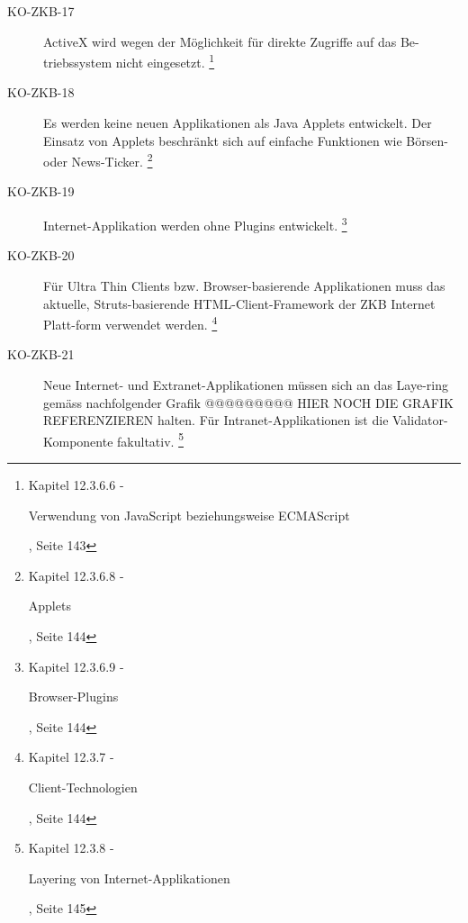 \documentclass[
11pt, %
a4paper, %
BCOR25mm, %
DIV14, %
footsepline = false, %
headsepline, %
twoside, %
openright,
abstracton, %
listof=totocnumbered, %
bibliography=totocnumbered %
]{scrreprt}
\begin{document}
\begin{description}
    \item[KO-ZKB-17] ActiveX wird wegen der Möglichkeit für direkte Zugriffe auf
    das Be-triebssystem nicht eingesetzt.
    \footnote{\cite{ZkbHandbuchDerItArchitektur} Kapitel 12.3.6.6 -
    \begin{itshape}Verwendung von JavaScript beziehungsweise ECMAScript\end{itshape}, Seite 143}
    
    \item[KO-ZKB-18] Es werden keine neuen Applikationen als Java Applets
    entwickelt. Der Einsatz von Applets beschränkt sich auf einfache Funktionen wie Börsen-
    oder News-Ticker.
    \footnote{\cite{ZkbHandbuchDerItArchitektur} Kapitel 12.3.6.8 -
    \begin{itshape}Applets\end{itshape}, Seite 144}
    
    \item[KO-ZKB-19] Internet-Applikation werden ohne Plugins entwickelt.
    \footnote{\cite{ZkbHandbuchDerItArchitektur} Kapitel 12.3.6.9 -
    \begin{itshape}Browser-Plugins\end{itshape}, Seite 144}
    
    \item[KO-ZKB-20] Für Ultra Thin Clients bzw. Browser-basierende
    Applikationen muss das aktuelle, Struts-basierende HTML-Client-Framework der ZKB Internet
    Platt-form verwendet werden.
    \footnote{\cite{ZkbHandbuchDerItArchitektur} Kapitel 12.3.7 -
    \begin{itshape}Client-Technologien\end{itshape}, Seite 144}
    
    \item[KO-ZKB-21] Neue Internet- und Extranet-Applikationen müssen sich an
    das Laye-ring gemäss nachfolgender Grafik @@@@@@@@@ HIER NOCH DIE GRAFIK
    REFERENZIEREN halten. Für Intranet-Applikationen ist die
    Validator-Komponente fakultativ.
    \footnote{\cite{ZkbHandbuchDerItArchitektur} Kapitel 12.3.8 -
    \begin{itshape}Layering von Internet-Applikationen\end{itshape}, Seite 145}
    

\end{description}
\end{document}
